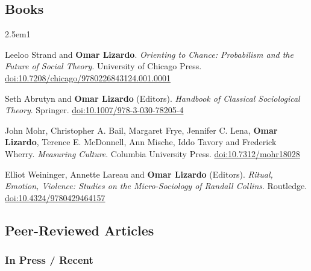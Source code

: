 \documentclass[
]{article}
\newenvironment{cventry}{\begin{hangparas}{2.5em}{1}}{\end{hangparas}}
\begin{document}
\subsection{Books}\label{books}

\begin{cventry}

Leeloo Strand and \textbf{Omar Lizardo}. \emph{Orienting to Chance:
Probabilism and the Future of Social Theory}. University of Chicago
Press.
\href{https://doi.org/10.7208/chicago/9780226843124.001.0001}{doi:10.7208/chicago/9780226843124.001.0001}

Seth Abrutyn and \textbf{Omar Lizardo} (Editors). \emph{Handbook of
Classical Sociological Theory}. Springer.
\href{https://doi.org/10.1007/978-3-030-78205-4}{doi:10.1007/978-3-030-78205-4}

John Mohr, Christopher A. Bail, Margaret Frye, Jennifer C. Lena,
\textbf{Omar Lizardo}, Terence E. McDonnell, Ann Mische, Iddo Tavory and
Frederick Wherry. \emph{Measuring Culture}. Columbia University Press.
\href{https://doi.org/10.7312/mohr18028}{doi:10.7312/mohr18028}

Elliot Weininger, Annette Lareau and \textbf{Omar Lizardo} (Editors).
\emph{Ritual, Emotion, Violence: Studies on the Micro-Sociology of
Randall Collins}. Routledge.
\href{https://doi.org/10.4324/9780429464157}{doi:10.4324/9780429464157}

\end{cventry}

\subsection{Peer-Reviewed Articles}\label{peer-reviewed-articles}

\subsubsection{In Press / Recent}\label{in-press-recent}
\end{document}
